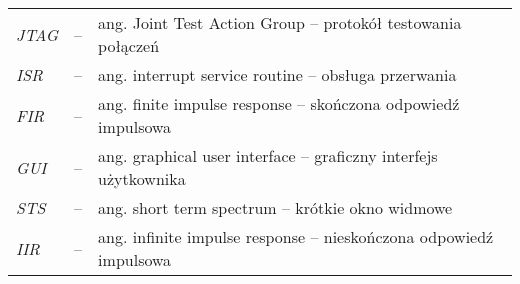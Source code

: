 \begin{tabular}{lcl}
	\textit{JTAG} & -- & ang. Joint Test Action Group -- protokół testowania połączeń \\
	\textit{ISR} & -- & ang. interrupt service routine -- obsługa przerwania \\
  \textit{FIR} & -- & ang. finite impulse response -- skończona odpowiedź impulsowa \\
	\textit{GUI} & -- & ang. graphical user interface -- graficzny interfejs użytkownika \\
  \textit{STS} & -- & ang. short term spectrum -- krótkie okno widmowe \\
	\textit{IIR} & -- & ang. infinite impulse response -- nieskończona odpowiedź impulsowa \\
\end{tabular} 
